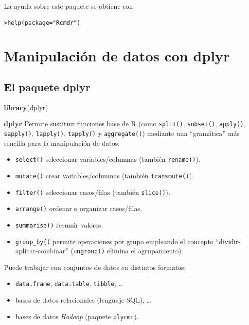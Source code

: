 \documentclass[]{book}
\newenvironment{Shaded}{\begin{snugshade}}{\end{snugshade}}
\newcommand{\KeywordTok}[1]{\textcolor[rgb]{0.13,0.29,0.53}{\textbf{#1}}}
\newcommand{\NormalTok}[1]{#1}
\providecommand{\tightlist}{%
  \setlength{\itemsep}{0pt}\setlength{\parskip}{0pt}}
\begin{document}
La ayuda sobre este paquete se obtiene con

\begin{verbatim}
>help(package="Rcmdr")
\end{verbatim}

\chapter{Manipulación de datos con
dplyr}\label{manipulacion-de-datos-con-dplyr}

\section{\texorpdfstring{El paquete
\textbf{dplyr}}{El paquete dplyr}}\label{el-paquete-dplyr}

\begin{Shaded}
\begin{Highlighting}[]
\KeywordTok{library}\NormalTok{(dplyr)}
\end{Highlighting}
\end{Shaded}

\textbf{dplyr} Permite sustituir funciones base de R (como
\texttt{split()}, \texttt{subset()}, \texttt{apply()},
\texttt{sapply()}, \texttt{lapply()}, \texttt{tapply()} y
\texttt{aggregate()}) mediante una ``gramática'' más sencilla para la
manipulación de datos:

\begin{itemize}
\tightlist
\item
  \texttt{select()} seleccionar variables/columnas (también
  \texttt{rename()}).
\item
  \texttt{mutate()} crear variables/columnas (también
  \texttt{transmute()}).
\item
  \texttt{filter()} seleccionar casos/filas (también \texttt{slice()}).
\item
  \texttt{arrange()} ordenar o organizar casos/filas.
\item
  \texttt{summarise()} resumir valores.
\item
  \texttt{group\_by()} permite operaciones por grupo empleando el
  concepto ``dividir-aplicar-combinar'' (\texttt{ungroup()} elimina el
  agrupamiento).
\end{itemize}

Puede trabajar con conjuntos de datos en distintos formatos:

\begin{itemize}
\tightlist
\item
  \texttt{data.frame}, \texttt{data.table}, \texttt{tibble}, \ldots{}
\item
  bases de datos relacionales (lenguaje SQL), \ldots{}
\item
  bases de datos \emph{Hadoop} (paquete \texttt{plyrmr}).
\end{itemize}
\end{document}
